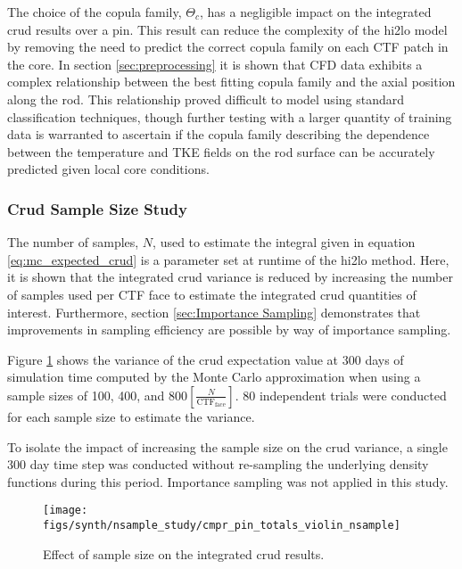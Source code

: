 The choice of the copula family, $\Theta_c$, has a negligible impact on the integrated crud results over a pin.  This result can reduce the complexity of the hi2lo model by removing the need to predict the correct copula family on each CTF patch in the core.  In section \ref{sec:preprocessing} it is shown that CFD data exhibits a complex relationship between the best fitting copula family and the axial position along the rod.  This relationship proved difficult to model using standard classification techniques, though further testing with a larger quantity of training data is warranted to ascertain if the copula family describing the dependence between the temperature and TKE fields on the rod surface can be accurately predicted given local core conditions.

\subsubsection{Crud Sample Size Study}

The number of samples, $N$, used to estimate the integral given in equation \ref{eq:mc_expected_crud} is a parameter set at runtime of the hi2lo method.  Here, it is shown that the integrated crud variance is reduced by increasing the number of samples used per CTF face to estimate the integrated crud quantities of interest.   Furthermore, section \ref{sec:Importance Sampling} demonstrates that improvements in sampling efficiency are possible by way of importance sampling.

Figure \ref{fig:cmprpintotalsviolinnsample} shows the variance of the crud expectation value at 300 days of simulation time computed by the Monte Carlo approximation when using a sample sizes of 100, 400, and $800  [\frac{N}{\mathrm{CTF_{face}}}]$.  80 independent trials were conducted for each sample size to estimate the variance.

To isolate the impact of increasing the sample size on the crud variance, a single 300 day time step was conducted without re-sampling the underlying density functions during this period.  Importance sampling was not applied in this study.

\begin{figure}[H]
    \centering
    \texttt{[image: figs/synth/nsample\_study/cmpr\_pin\_totals\_violin\_nsample]}
    \caption{Effect of sample size on the integrated crud results.}
    \label{fig:cmprpintotalsviolinnsample}
\end{figure}

